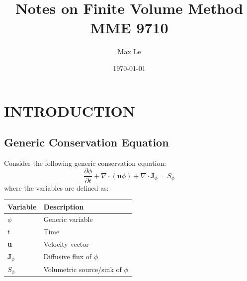 \documentclass[11pt]{article}
\author{Max Le}
\date{\today}
\title{Notes on Finite Volume Method MME 9710}
\begin{document}
\maketitle
\tableofcontents

\setlength\parindent{0pt}



\lstset{style=mystyle}
\renewcommand{\arraystretch}{2}
\renewcommand{\footrulewidth}{0.4pt}%
\pagestyle{fancy}
\fancyhf{}
\fancyfoot{}
\fancyhead[L]{\scriptsize{\leftmark}}
\fancyhead[R]{\scriptsize{\rightmark}}
\newpage
\section{INTRODUCTION}
\label{sec:org6275864}
\subsection{Generic Conservation Equation}
\label{sec:orga332f5f}
Consider the following generic conservation equation:
\begin{equation}
\frac{\partial \phi}{\partial t} + \nabla \cdot (\textbf{u}\phi) + \nabla \cdot \textbf{J}_\phi = S_\phi
\end{equation}
where the variables are defined as:


\begin{center}
\begin{tabular}{ll}
\textbf{Variable} & \textbf{Description}\\
\hline
\(\phi\) & Generic variable\\
\(t\) & Time\\
\textbf{u} & Velocity vector\\
\(\textbf{J}_\phi\) & Diffusive flux of \(\phi\)\\
\(S_\phi\) & Volumetric source/sink of \(\phi\)\\
\hline
\end{tabular}
\end{center}
\end{document}
